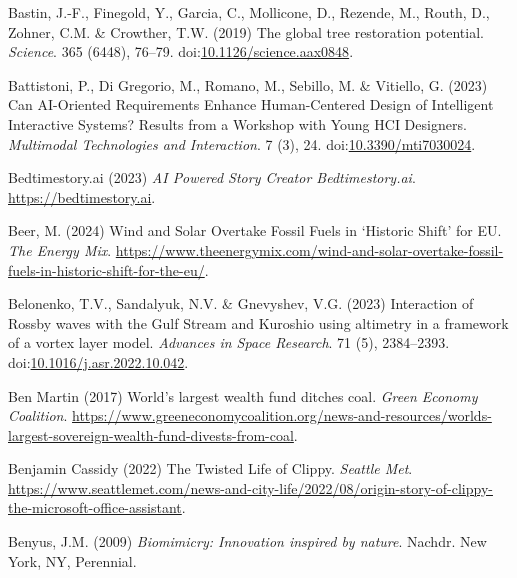 \documentclass[
  letterpaper,
  DIV=11,
  numbers=noendperiod]{scrartcl}
\newlength{\cslhangindent}
\newenvironment{CSLReferences}[2] %
 {\begin{list}{}{%
  \setlength{\itemindent}{0pt}
  \setlength{\leftmargin}{0pt}
  \setlength{\parsep}{0pt}
  \ifodd #1
   \setlength{\leftmargin}{\cslhangindent}
   \setlength{\itemindent}{-1\cslhangindent}
  \fi
  \setlength{\itemsep}{#2\baselineskip}}}
 {\end{list}}
\begin{document}
\begin{CSLReferences}{0}{1}
Bastin, J.-F., Finegold, Y., Garcia, C., Mollicone, D., Rezende, M.,
Routh, D., Zohner, C.M. \& Crowther, T.W. (2019) The global tree
restoration potential. \emph{Science}. 365 (6448), 76--79.
doi:\href{https://doi.org/10.1126/science.aax0848}{10.1126/science.aax0848}.

Battistoni, P., Di Gregorio, M., Romano, M., Sebillo, M. \& Vitiello, G.
(2023) Can {AI-Oriented Requirements Enhance Human-Centered Design} of
{Intelligent Interactive Systems}? {Results} from a {Workshop} with
{Young HCI Designers}. \emph{Multimodal Technologies and Interaction}. 7
(3), 24.
doi:\href{https://doi.org/10.3390/mti7030024}{10.3390/mti7030024}.

Bedtimestory.ai (2023) \emph{{AI Powered Story Creator} {\textbar}
{Bedtimestory}.ai}. \url{https://bedtimestory.ai}.

Beer, M. (2024) Wind and {Solar Overtake Fossil Fuels} in {`{Historic
Shift}'} for {EU}. \emph{The Energy Mix}.
\url{https://www.theenergymix.com/wind-and-solar-overtake-fossil-fuels-in-historic-shift-for-the-eu/}.

Belonenko, T.V., Sandalyuk, N.V. \& Gnevyshev, V.G. (2023) Interaction
of {Rossby} waves with the {Gulf Stream} and {Kuroshio} using altimetry
in a framework of a vortex layer model. \emph{Advances in Space
Research}. 71 (5), 2384--2393.
doi:\href{https://doi.org/10.1016/j.asr.2022.10.042}{10.1016/j.asr.2022.10.042}.

Ben Martin (2017) World's largest wealth fund ditches coal. \emph{Green
Economy Coalition}.
\url{https://www.greeneconomycoalition.org/news-and-resources/worlds-largest-sovereign-wealth-fund-divests-from-coal}.

Benjamin Cassidy (2022) The {Twisted Life} of {Clippy}. \emph{Seattle
Met}.
\url{https://www.seattlemet.com/news-and-city-life/2022/08/origin-story-of-clippy-the-microsoft-office-assistant}.

Benyus, J.M. (2009) \emph{Biomimicry: Innovation inspired by nature}.
Nachdr. New York, NY, Perennial.


\end{CSLReferences}
\end{document}
